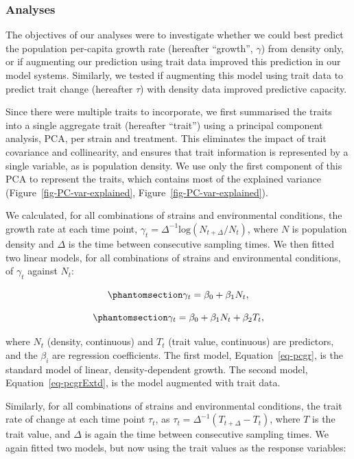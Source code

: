 \documentclass[
  letterpaper,
  DIV=11,
  numbers=noendperiod]{scrartcl}
\begin{document}
\subsubsection{Analyses}\label{analyses}

The objectives of our analyses were to investigate whether we could best
predict the population per-capita growth rate (hereafter ``growth'',
\(\gamma\)) from density only, or if augmenting our prediction using
trait data improved this prediction in our model systems. Similarly, we
tested if augmenting this model using trait data to predict trait change
(hereafter \(\tau\)) with density data improved predictive capacity.

Since there were multiple traits to incorporate, we first summarised the
traits into a single aggregate trait (hereafter ``trait'') using a
principal component analysis, PCA, per strain and treatment. This
eliminates the impact of trait covariance and collinearity, and ensures
that trait information is represented by a single variable, as is
population density. We use only the first component of this PCA to
represent the traits, which contains most of the explained variance
(Figure~\ref{fig-PC-var-explained}, Figure~\ref{fig-PC-var-explained}).

We calculated, for all combinations of strains and environmental
conditions, the growth rate at each time point,
\(\gamma_t=\Delta^{-1}\textrm{log}(N_{t+\Delta}/N_t)\), where \(N\) is
population density and \(\Delta\) is the time between consecutive
sampling times. We then fitted two linear models, for all combinations
of strains and environmental conditions, of \(\gamma_t\) against
\(N_t\):

\begin{equation}\phantomsection\label{eq-pcgr}{
\gamma_t = \beta_0 + \beta_1 N_t,
}\end{equation}

\begin{equation}\phantomsection\label{eq-pcgrExtd}{
\gamma_t = \beta_0 + \beta_1 N_t + \beta_2 T_t,
}\end{equation}

where \(N_t\) (density, continuous) and \(T_t\) (trait value,
continuous) are predictors, and the \(\beta_i\) are regression
coefficients. The first model, Equation~\ref{eq-pcgr}, is the standard
model of linear, density-dependent growth. The second model,
Equation~\ref{eq-pcgrExtd}, is the model augmented with trait data.

Similarly, for all combinations of strains and environmental conditions,
the trait rate of change at each time point \(\tau_t\), as
\(\tau_t=\Delta^{-1}(T_{t+\Delta}-T_{t})\), where \(T\) is the trait
value, and \(\Delta\) is again the time between consecutive sampling
times. We again fitted two models, but now using the trait values as the
response variables:
\end{document}

